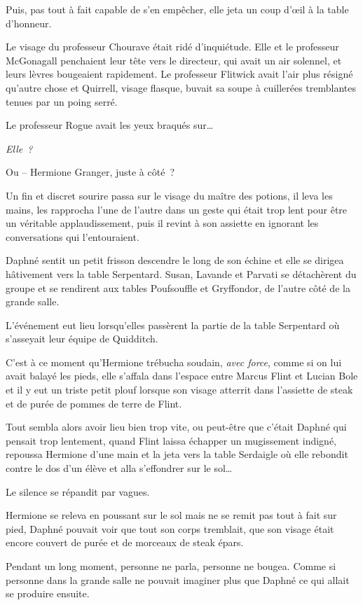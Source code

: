 Puis, pas tout à fait capable de s'en empêcher, elle jeta un coup d'œil à la table d'honneur.

Le visage du professeur Chourave était ridé d'inquiétude.
Elle et le professeur McGonagall penchaient leur tête vers le directeur, qui avait un air solennel, et leurs lèvres bougeaient rapidement.
Le professeur Flitwick avait l'air plus résigné qu'autre chose et Quirrell, visage flasque, buvait sa soupe à cuillerées tremblantes tenues par un poing serré.

Le professeur Rogue avait les yeux braqués sur…

\emph{Elle~?}

Ou -- Hermione Granger, juste à côté~?

Un fin et discret sourire passa sur le visage du maître des potions, il leva les mains, les rapprocha l'une de l'autre dans un geste qui était trop lent pour être un véritable applaudissement, puis il revint à son assiette en ignorant les conversations qui l'entouraient.

Daphné sentit un petit frisson descendre le long de son échine et elle se dirigea hâtivement vers la table Serpentard.
Susan, Lavande et Parvati se détachèrent du groupe et se rendirent aux tables Poufsouffle et Gryffondor, de l'autre côté de la grande salle.

L'événement eut lieu lorsqu'elles passèrent la partie de la table Serpentard où s'asseyait leur équipe de Quidditch.

C'est à ce moment qu'Hermione trébucha soudain, \emph{avec force}, comme si on lui avait balayé les pieds, elle s'affala dans l'espace entre Marcus Flint et Lucian Bole et il y eut un triste petit plouf lorsque son visage atterrit dans l'assiette de steak et de purée de pommes de terre de Flint.

Tout sembla alors avoir lieu bien trop vite, ou peut-être que c'était Daphné qui pensait trop lentement, quand Flint laissa échapper un mugissement indigné, repoussa Hermione d'une main et la jeta vers la table Serdaigle où elle rebondit contre le dos d'un élève et alla s'effondrer sur le sol…

Le silence se répandit par vagues.

Hermione se releva en poussant sur le sol mais ne se remit pas tout à fait sur pied, Daphné pouvait voir que tout son corps tremblait, que son visage était encore couvert de purée et de morceaux de steak épars.

Pendant un long moment, personne ne parla, personne ne bougea.
Comme si personne dans la grande salle ne pouvait imaginer plus que Daphné ce qui allait se produire ensuite.

